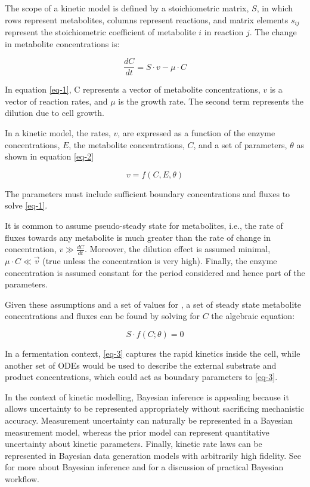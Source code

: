 \documentclass[journal=asbcd6,manuscript=article,layout=traditional]{achemso}
\begin{document}
The scope of a kinetic model is defined by a stoichiometric matrix,
\(S\), in which rows represent metabolites, columns represent reactions,
and matrix elements \(s_{ij}\) represent the stoichiometric coefficient
of metabolite \(i\) in reaction \(j\). The change in metabolite
concentrations is:

\begin{equation}\label{eq-1}
\frac{dC}{dt} = S\cdot v - \mu\cdot C 
\end{equation}

In equation \eqref{eq-1}, C represents a vector of metabolite
concentrations, \(v\) is a vector of reaction rates, and \(\mu\) is the
growth rate. The second term represents the dilution due to cell growth.

In a kinetic model, the rates, \(v\), are expressed as a function of the
enzyme concentrations, \(E\), the metabolite concentrations, \(C\), and
a set of parameters, \(\theta\) as shown in equation \eqref{eq-2}

\begin{equation}\label{eq-2}
v = f(C, E, \theta)
\end{equation}

The parameters must include sufficient boundary concentrations and
fluxes to solve \eqref{eq-1}.

It is common to assume pseudo-steady state for metabolites, i.e., the
rate of fluxes towards any metabolite is much greater than the rate of
change in concentration, \(𝑣 \gg \frac{𝑑𝐶}{𝑑𝑡}\). Moreover, the dilution
effect is assumed minimal, \(\mu\cdot C \ll \vec{v}\) (true unless the
concentration is very high). Finally, the enzyme concentration is
assumed constant for the period considered and hence part of the
parameters.

Given these assumptions and a set of values for \theta, a set of steady
state metabolite concentrations and fluxes can be found by solving for
\(C\) the algebraic equation:

\begin{equation}\label{eq-3}
S\cdot f(C;\theta) = 0
\end{equation}

In a fermentation context, \eqref{eq-3} captures the rapid kinetics
inside the cell, while another set of ODEs would be used to describe the
external substrate and product concentrations, which could act as
boundary parameters to \eqref{eq-3}.

In the context of kinetic modelling, Bayesian inference is appealing
because it allows uncertainty to be represented appropriately without
sacrificing mechanistic accuracy. Measurement uncertainty can naturally
be represented in a Bayesian measurement model, whereas the prior model
can represent quantitative uncertainty about kinetic parameters.
Finally, kinetic rate laws can be represented in Bayesian data
generation models with arbitrarily high fidelity. See
\citet{gelmanBayesianDataAnalysis2020a} for more about Bayesian
inference and \citet{gelmanBayesianWorkflow2020} for a discussion of
practical Bayesian workflow.
\end{document}
